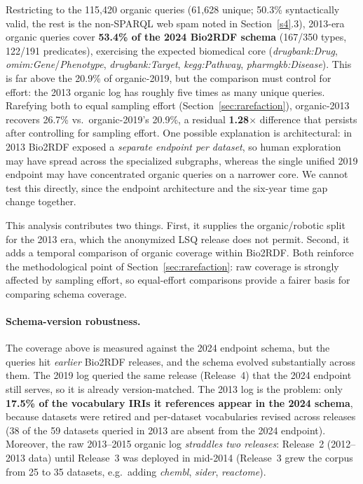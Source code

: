 \documentclass[sw]{iosart2x}
\begin{document}
Restricting to the 115{,}420 organic queries (61{,}628 unique; 50.3\% syntactically valid, the rest is the non-SPARQL web spam noted in Section~\ref{s4}.3), 2013-era organic queries cover \textbf{53.4\% of the 2024 Bio2RDF schema} (167/350 types, 122/191 predicates), exercising the expected biomedical core (\emph{drugbank:Drug}, \emph{omim:Gene}/\emph{Phenotype}, \emph{drugbank:Target}, \emph{kegg:Pathway}, \emph{pharmgkb:Disease}). This is far above the 20.9\% of organic-2019, but the comparison must control for effort: the 2013 organic log has roughly five times as many unique queries. Rarefying both to equal sampling effort (Section~\ref{sec:rarefaction}), organic-2013 recovers 26.7\% vs.\ organic-2019's 20.9\%, a residual \textbf{1.28$\times$} difference that persists after controlling for sampling effort. One possible explanation is architectural: in 2013 Bio2RDF exposed a \emph{separate endpoint per dataset}, so human exploration may have spread across the specialized subgraphs, whereas the single unified 2019 endpoint may have concentrated organic queries on a narrower core. We cannot test this directly, since the endpoint architecture and the six-year time gap change together.

This analysis contributes two things. First, it supplies the organic/robotic split for the 2013 era, which the anonymized LSQ release does not permit. Second, it adds a temporal comparison of organic coverage within Bio2RDF. Both reinforce the methodological point of Section~\ref{sec:rarefaction}: raw coverage is strongly affected by sampling effort, so equal-effort comparisons provide a fairer basis for comparing schema coverage.

\paragraph{\textbf{Schema-version robustness.}} The coverage above is measured against the 2024 endpoint schema, but the queries hit \emph{earlier} Bio2RDF releases, and the schema evolved substantially across them. The 2019 log queried the same release (Release~4) that the 2024 endpoint still serves, so it is already version-matched. The 2013 log is the problem: only \textbf{17.5\% of the vocabulary IRIs it references appear in the 2024 schema}, because datasets were retired and per-dataset vocabularies revised across releases (38 of the 59 datasets queried in 2013 are absent from the 2024 endpoint). Moreover, the raw 2013--2015 organic log \emph{straddles two releases}: Release~2 (2012--2013 data) until Release~3 was deployed in mid-2014 (Release~3 grew the corpus from 25 to 35 datasets, e.g.\ adding \emph{chembl}, \emph{sider}, \emph{reactome}).
\end{document}

